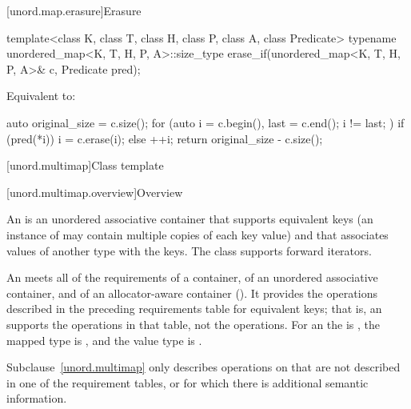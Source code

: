 [unord.map.erasure]{Erasure}

%
\begin{itemdecl}
template<class K, class T, class H, class P, class A, class Predicate>
  typename unordered_map<K, T, H, P, A>::size_type
    erase_if(unordered_map<K, T, H, P, A>& c, Predicate pred);
\end{itemdecl}

\begin{itemdescr}
\pnum
\effects
Equivalent to:
\begin{codeblock}
auto original_size = c.size();
for (auto i = c.begin(), last = c.end(); i != last; ) {
  if (pred(*i)) {
    i = c.erase(i);
  } else {
    ++i;
  }
}
return original_size - c.size();
\end{codeblock}
\end{itemdescr}

[unord.multimap]{Class template }%

[unord.multimap.overview]{Overview}

\pnum
{}%
%
An  is an unordered associative container
that supports equivalent keys (an instance of  may contain
multiple copies of each key value) and that associates values of
another type  with the keys.
The  class
supports forward iterators.

\pnum
An  meets all of the requirements of a container, of an
unordered associative container, and of an allocator-aware container
(). It provides the operations described in the
preceding requirements table for equivalent keys; that is, an 
supports the  operations in that table, not the  operations.
For an  the  is , the
mapped type is , and the value type is .

\pnum
Subclause~\ref{unord.multimap} only describes operations on 
that are not described in one of the requirement tables, or for which
there is additional semantic information.

